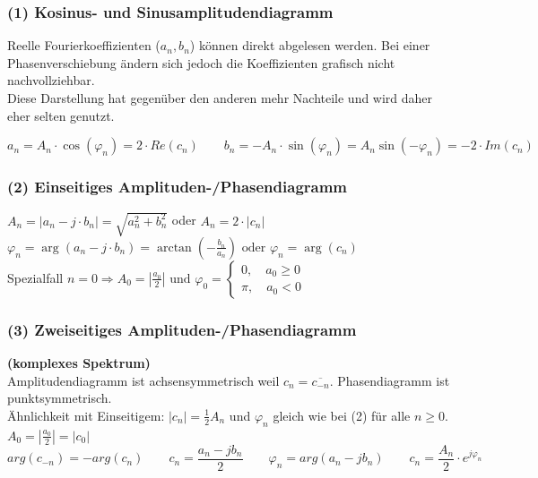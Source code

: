 \subsubsection{(1) Kosinus- und Sinusamplitudendiagramm} 
Reelle Fourierkoeffizienten ($a_n, b_n$) können direkt abgelesen werden. 
Bei einer Phasenverschiebung ändern sich jedoch die Koeffizienten grafisch nicht nachvollziehbar. \\
Diese Darstellung hat gegenüber den anderen mehr Nachteile und wird daher eher selten genutzt.

$$a_n = A_n \cdot \cos(\varphi_n) = 2\cdot Re(c_n) \qquad b_n = -A_n \cdot \sin(\varphi_n) = A_n \sin(-\varphi_n) = -2\cdot Im(c_n)$$

\begin{multicols}{2}
	\subsubsection{(2) Einseitiges Amplituden-/Phasendiagramm} 
	$A_n = |a_n - j \cdot b_n| = \sqrt{a_n^2 + b_n^2}$ oder $A_n = 2 \cdot |c_n|$\\
	$\varphi_n = \arg(a_n - j \cdot b_n) = \arctan(-\frac{b_n}{a_n}) \text{ oder } \varphi_n = \arg(c_n) $ \\
	Spezialfall $n=0 \Rightarrow A_0 = |\frac{a_0}{2}| \text{ und } \varphi_0 = \left\{
	\begin{array}{l} 
	0, \quad a_0 \geq 0\\
	\pi, \quad a_0 < 0  
	\end{array}
	\right. $\\
	\vfill\null
	\columnbreak
	\subsubsection{(3) Zweiseitiges Amplituden-/Phasendiagramm}
	\textbf{(komplexes Spektrum)}\\ 
	Amplitudendiagramm ist achsensymmetrisch weil $ c_n=\overline{c_{-n}} $. Phasendiagramm ist punktsymmetrisch. \\
	Ähnlichkeit mit Einseitigem: $|c_n| = \frac{1}{2}A_n $ und $\varphi_n$ gleich wie bei (2) für alle $ n \geq 0$.\\
	$A_0 = |\frac{a_0}{2}| = |c_0| $
	$$arg(c_{-n}) = -arg(c_n) \qquad c_n = \frac{a_n - jb_n}{2} \qquad \varphi_n = arg(a_n - jb_n) \qquad c_n = \frac{A_n}{2} \cdot e^{j\varphi_n}$$
\end{multicols}

